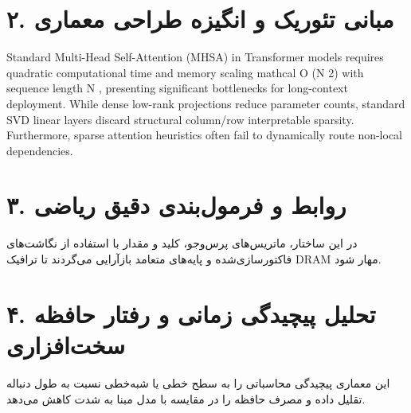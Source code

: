 \documentclass[12pt,a4paper]{article}
\begin{document}
\section*{۲. مبانی تئوریک و انگیزه طراحی معماری}
Standard Multi-Head Self-Attention (MHSA) in Transformer models requires quadratic computational time and memory scaling mathcal O (N 2) with sequence length N , presenting significant bottlenecks for long-context deployment. While dense low-rank projections reduce parameter counts, standard SVD linear layers discard structural column/row interpretable sparsity. Furthermore, sparse attention heuristics often fail to dynamically route non-local dependencies.

\section*{۳. روابط و فرمول‌بندی دقیق ریاضی}
در این ساختار، ماتریس‌های پرس‌وجو، کلید و مقدار با استفاده از نگاشت‌های فاکتورسازی‌شده و پایه‌های متعامد بازآرایی می‌گردند تا ترافیک DRAM مهار شود.

\section*{۴. تحلیل پیچیدگی زمانی و رفتار حافظه سخت‌افزاری}
این معماری پیچیدگی محاسباتی را به سطح خطی یا شبه‌خطی نسبت به طول دنباله تقلیل داده و مصرف حافظه را در مقایسه با مدل مبنا به شدت کاهش می‌دهد.
\end{document}
